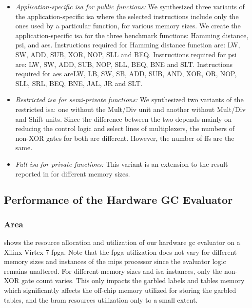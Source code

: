 \begin{itemize}
	\item \emph{Application-specific \acrshort{isa} for public functions:} We synthesized three variants of the application-specific \acrshort{isa} where the selected instructions include only the ones used by a particular function, for various memory sizes.
	We create the application-specific \acrshort{isa} for the three benchmark functions: Hamming distance, \acrshort{psi}, and \acrshort{aes}.
	Instructions required for Hamming distance function are: LW, SW, ADD, SUB, XOR, NOP, SLL and BEQ.
	Instructions required for \acrshort{psi} are: LW, SW, ADD, SUB, NOP, SLL, BEQ, BNE and SLT.
 	Instructions required for \acrshort{aes} areLW, LB, SW, SB, ADD, SUB, AND, XOR, OR, NOP, SLL, SRL, BEQ, BNE, JAL, JR and SLT.

	\item \emph{Restricted \acrshort{isa} for semi-private functions:} We synthesized two variants of the restricted \acrshort{isa}: one without the Mult/Div unit and another without Mult/Div and Shift units.
	Since the difference between the two depends mainly on reducing the control logic and select lines of multiplexers, the numbers of non-XOR gates for both are different.
	However, the number of \acrshort{ff}s are the same.

	\item \emph{Full \acrshort{isa} for private
	functions:} This variant is an extension to the result reported in  for different memory sizes.
\end{itemize}

\subsection{Performance of the Hardware GC Evaluator} \label{ssect:eval-mips-sfe-performance}
\subsubsection{Area}
 shows the resource allocation and utilization of our hardware \acrshort{gc} evaluator on a Xilinx Virtex-7 \acrshort{fpga}.
Note that the \acrshort{fpga} utilization does not vary for different memory sizes and instances of the \gls{mips} processor since the evaluator logic remains unaltered.
For different memory sizes and \acrshort{isa} instances, only the non-XOR gate count varies.
This only impacts the garbled labels and tables memory which significantly affects the off-chip memory utilized for storing the garbled tables, and the \acrfull{bram} resources utilization only to a small extent.

